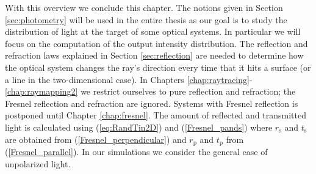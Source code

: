 With this overview we conclude this chapter. The notions given in Section \ref{sec:photometry} will be used in the entire thesis as our goal is to study the distribution of light at the target of some optical systems. In particular we will focus on the computation of the output intensity distribution. The reflection and refraction laws explained in Section \ref{sec:reflection} are needed to determine how the optical system changes the ray's direction every time that it hits a surface (or a line in the two-dimensional case). In Chapters \ref{chap:raytracing}-\ref{chap:raymapping2} we restrict ourselves to pure reflection and refraction; the Fresnel reflection and refraction are ignored. Systems with Fresnel reflection is postponed until Chapter \ref{chap:fresnel}. The amount of reflected and transmitted light is calculated using (\ref{eq:RandTin2D}) and (\ref{Fresnel_pands}) where $r_\textrm{s}$ and $t_\textrm{s}$ are obtained from (\ref{Fresnel_perpendicular}) and $r_\textrm{p}$ and $t_\textrm{p}$ from (\ref{Fresnel_parallel}). In our simulations we consider the general case of unpolarized light. 
